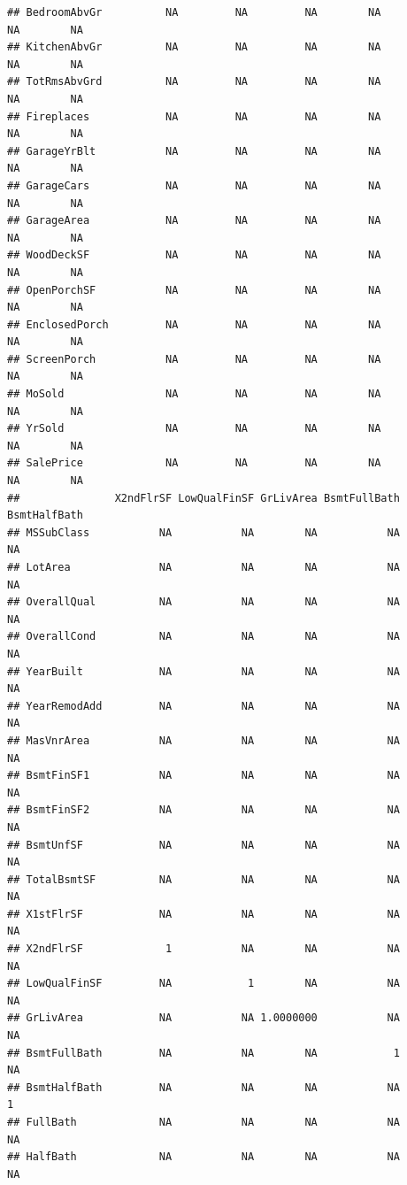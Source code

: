 \documentclass[
]{article}
\begin{document}
\begin{verbatim}
## BedroomAbvGr          NA         NA         NA        NA          NA        NA
## KitchenAbvGr          NA         NA         NA        NA          NA        NA
## TotRmsAbvGrd          NA         NA         NA        NA          NA        NA
## Fireplaces            NA         NA         NA        NA          NA        NA
## GarageYrBlt           NA         NA         NA        NA          NA        NA
## GarageCars            NA         NA         NA        NA          NA        NA
## GarageArea            NA         NA         NA        NA          NA        NA
## WoodDeckSF            NA         NA         NA        NA          NA        NA
## OpenPorchSF           NA         NA         NA        NA          NA        NA
## EnclosedPorch         NA         NA         NA        NA          NA        NA
## ScreenPorch           NA         NA         NA        NA          NA        NA
## MoSold                NA         NA         NA        NA          NA        NA
## YrSold                NA         NA         NA        NA          NA        NA
## SalePrice             NA         NA         NA        NA          NA        NA
##               X2ndFlrSF LowQualFinSF GrLivArea BsmtFullBath BsmtHalfBath
## MSSubClass           NA           NA        NA           NA           NA
## LotArea              NA           NA        NA           NA           NA
## OverallQual          NA           NA        NA           NA           NA
## OverallCond          NA           NA        NA           NA           NA
## YearBuilt            NA           NA        NA           NA           NA
## YearRemodAdd         NA           NA        NA           NA           NA
## MasVnrArea           NA           NA        NA           NA           NA
## BsmtFinSF1           NA           NA        NA           NA           NA
## BsmtFinSF2           NA           NA        NA           NA           NA
## BsmtUnfSF            NA           NA        NA           NA           NA
## TotalBsmtSF          NA           NA        NA           NA           NA
## X1stFlrSF            NA           NA        NA           NA           NA
## X2ndFlrSF             1           NA        NA           NA           NA
## LowQualFinSF         NA            1        NA           NA           NA
## GrLivArea            NA           NA 1.0000000           NA           NA
## BsmtFullBath         NA           NA        NA            1           NA
## BsmtHalfBath         NA           NA        NA           NA            1
## FullBath             NA           NA        NA           NA           NA
## HalfBath             NA           NA        NA           NA           NA

\end{verbatim}
\end{document}
